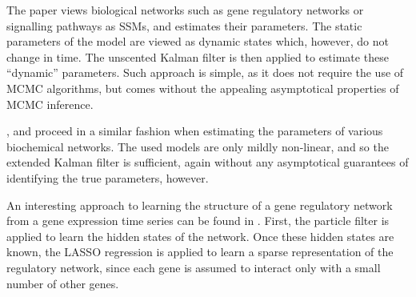 The paper \cite{bio1} views biological networks such as gene regulatory networks or signalling pathways as SSMs, and estimates their parameters. The static parameters of the model are viewed as dynamic states which, however, do not change in time. The unscented Kalman filter is then applied to estimate these ``dynamic'' parameters. Such approach is simple, as it does not require the use of MCMC algorithms, but comes without the appealing asymptotical properties of MCMC inference.

\cite{bio2}, \cite{bio3} and \cite{bio4} proceed in a similar fashion when estimating the parameters of various biochemical networks. The used models are only mildly non-linear, and so the extended Kalman filter is sufficient, again without any asymptotical guarantees of identifying the true parameters, however.

An interesting approach to learning the structure of a gene regulatory network from a gene expression time series can be found in \cite{bio5}. First, the particle filter is applied to learn the hidden states of the network. Once these hidden states are known, the LASSO regression is applied to learn a sparse representation of the regulatory network, since each gene is assumed to interact only with a small number of other genes.